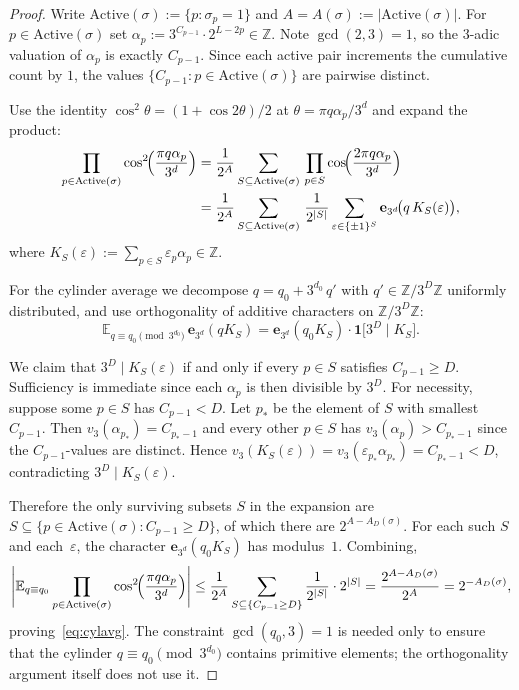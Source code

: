 \documentclass[11pt,a4paper]{amsart}
\theoremstyle{plain}
\theoremstyle{definition}
\newcommand{\Z}{\mathbb{Z}}
\newcommand{\E}{\mathbb{E}}
\begin{document}
\begin{proof}
Write $\mathrm{Active}(\sigma):=\{p:\sigma_p=1\}$ and $A=A(\sigma):=|\mathrm{Active}(\sigma)|$.
For $p\in\mathrm{Active}(\sigma)$ set $\alpha_p:=3^{C_{p-1}}\cdot 2^{L-2p}\in\Z$.
Note $\gcd(2,3)=1$, so the $3$-adic valuation of $\alpha_p$ is exactly
$C_{p-1}$.
Since each active pair increments the cumulative count by $1$, the values
$\{C_{p-1}:p\in\mathrm{Active}(\sigma)\}$ are pairwise distinct.

Use the identity $\cos^2\theta=(1+\cos 2\theta)/2$ at $\theta=\pi q\alpha_p/3^d$
and expand the product:
\begin{align*}
\prod_{p\in\mathrm{Active}(\sigma)}\cos^2\!\Bigl(\frac{\pi q\alpha_p}{3^d}\Bigr)
&=\frac{1}{2^A}\sum_{S\subseteq\mathrm{Active}(\sigma)}\,\prod_{p\in S}\cos\!\Bigl(\frac{2\pi q\alpha_p}{3^d}\Bigr)\\
&=\frac{1}{2^A}\sum_{S\subseteq\mathrm{Active}(\sigma)}\,\frac{1}{2^{|S|}}\sum_{\varepsilon\in\{\pm1\}^S}
\mathbf e_{3^d}\!\bigl(q\,K_S(\varepsilon)\bigr),
\end{align*}
where $K_S(\varepsilon):=\sum_{p\in S}\varepsilon_p\alpha_p\in\Z$.

For the cylinder average we decompose $q=q_0+3^{d_0}\,q'$ with
$q'\in\Z/3^{D}\Z$ uniformly distributed, and use orthogonality of additive
characters on $\Z/3^D\Z$:
\begin{equation}\label{eq:char-orth}
\E_{q\equiv q_0\!\!\pmod{3^{d_0}}}\,\mathbf e_{3^d}(qK_S)
=\mathbf e_{3^d}(q_0K_S)\cdot\mathbf 1\bigl[3^D\mid K_S\bigr].
\end{equation}

We claim that $3^D\mid K_S(\varepsilon)$ if and only if every $p\in S$ satisfies
$C_{p-1}\ge D$.
Sufficiency is immediate since each $\alpha_p$ is then divisible by $3^D$.
For necessity, suppose some $p\in S$ has $C_{p-1}<D$.
Let $p_\ast$ be the element of $S$ with smallest $C_{p-1}$.
Then $v_3(\alpha_{p_\ast})=C_{p_\ast-1}$ and every other $p\in S$ has
$v_3(\alpha_p)>C_{p_\ast-1}$ since the $C_{p-1}$-values are distinct.
Hence
$v_3(K_S(\varepsilon))=v_3(\varepsilon_{p_\ast}\alpha_{p_\ast})=C_{p_\ast-1}<D$,
contradicting $3^D\mid K_S(\varepsilon)$.

Therefore the only surviving subsets $S$ in the expansion are
$S\subseteq\{p\in\mathrm{Active}(\sigma):C_{p-1}\ge D\}$, of which there
are $2^{A-A_D(\sigma)}$.
For each such $S$ and each~$\varepsilon$, the character
$\mathbf e_{3^d}(q_0K_S)$ has modulus~$1$.
Combining,
$$
\Biggl|\E_{q\equiv q_0}\prod_{p\in\mathrm{Active}(\sigma)}\cos^2\!\Bigl(\frac{\pi q\alpha_p}{3^d}\Bigr)\Biggr|
\le\frac{1}{2^A}\sum_{S\subseteq\{C_{p-1}\ge D\}}\frac{1}{2^{|S|}}\cdot 2^{|S|}
=\frac{2^{A-A_D(\sigma)}}{2^A}=2^{-A_D(\sigma)},
$$
proving~\eqref{eq:cylavg}.
The constraint $\gcd(q_0,3)=1$ is needed only to ensure that the cylinder
$q\equiv q_0\pmod{3^{d_0}}$ contains primitive elements; the orthogonality
argument itself does not use it.
\end{proof}
\end{document}
